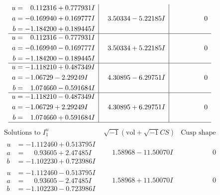\documentclass[1p]{elsarticle_modified}
\theoremstyle{definition}
\newcommand{\I}{\sqrt{-1}}
\begin{document}
$$\begin{array}{c|c|c}
\begin{aligned}
u &= \phantom{-}0.112316 + 0.777931 I \\
a &= -0.169940 + 0.169777 I \\
b &= -1.184200 + 0.189445 I\end{aligned}
 & \phantom{-}3.50334 - 5.22185 I & \phantom{-0.000000 } 0 \\ \hline\begin{aligned}
u &= \phantom{-}0.112316 - 0.777931 I \\
a &= -0.169940 - 0.169777 I \\
b &= -1.184200 - 0.189445 I\end{aligned}
 & \phantom{-}3.50334 + 5.22185 I & \phantom{-0.000000 } 0 \\ \hline\begin{aligned}
u &= -1.118210 + 0.487349 I \\
a &= -1.06729 - 2.29249 I \\
b &= \phantom{-}1.074660 - 0.591684 I\end{aligned}
 & \phantom{-}4.30895 - 6.29751 I & \phantom{-0.000000 } 0 \\ \hline\begin{aligned}
u &= -1.118210 - 0.487349 I \\
a &= -1.06729 + 2.29249 I \\
b &= \phantom{-}1.074660 + 0.591684 I\end{aligned}
 & \phantom{-}4.30895 + 6.29751 I & \phantom{-0.000000 } 0\\
 \hline 
 \end{array}$$\newpage$$\begin{array}{c|c|c}  
\text{Solutions to }I^u_{1}& \I (\text{vol} + \sqrt{-1}CS) & \text{Cusp shape}\\
 \hline 
\begin{aligned}
u &= -1.112460 + 0.513795 I \\
a &= \phantom{-}0.93605 + 2.47485 I \\
b &= -1.102230 + 0.723986 I\end{aligned}
 & \phantom{-}1.58968 - 11.50070 I & \phantom{-0.000000 } 0 \\ \hline\begin{aligned}
u &= -1.112460 - 0.513795 I \\
a &= \phantom{-}0.93605 - 2.47485 I \\
b &= -1.102230 - 0.723986 I\end{aligned}
 & \phantom{-}1.58968 + 11.50070 I & \phantom{-0.000000 } 0 \\ \hline\begin{aligned}

\end{aligned}
\end{array}$$
\end{document}
